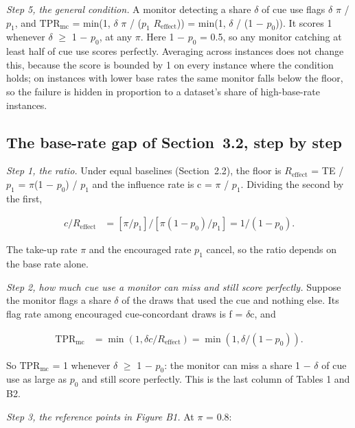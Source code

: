 \documentclass[11pt,a4paper]{article}
\begin{document}
\emph{Step 5, the general condition.} A monitor detecting a share $\delta$ of cue use flags $\delta$ $\pi$ / $p_1$, and $\mathrm{TPR}_{\mathrm{mc}}$ = min(1, $\delta$ $\pi$ / ($p_1$ $R_{\mathrm{effect}}$)) = min(1, $\delta$ / (1 $-$ $p_0$)). It scores 1 whenever $\delta$ $\geq$ 1 $-$ $p_0$, at any $\pi$. Here 1 $-$ $p_0$ = 0.5, so any monitor catching at least half of cue use scores perfectly. Averaging across instances does not change this, because the score is bounded by 1 on every instance where the condition holds; on instances with lower base rates the same monitor falls below the floor, so the failure is hidden in proportion to a dataset’s share of high-base-rate instances.

\setcounter{subsection}{2}
\subsection{The base-rate gap of Section~3.2, step by step}
\emph{Step 1, the ratio.} Under equal baselines (Section~2.2), the floor is $R_{\mathrm{effect}}$ = TE / $p_1$ = $\pi$(1 $-$ $p_0$) / $p_1$ and the influence rate is c = $\pi$ / $p_1$. Dividing the second by the first,

\begin{align*}
  c / R_{\mathrm{effect}} &= [\pi  / p_1] / [\pi (1 - p_0) / p_1] = 1 / (1 - p_0).
\end{align*}

The take-up rate $\pi$ and the encouraged rate $p_1$ cancel, so the ratio depends on the base rate alone.

\emph{Step 2, how much cue use a monitor can miss and still score perfectly.} Suppose the monitor flags a share $\delta$ of the draws that used the cue and nothing else. Its flag rate among encouraged cue-concordant draws is f = $\delta$c, and

\begin{align*}
  \mathrm{TPR}_{\mathrm{mc}} &= \min(1, \delta c / R_{\mathrm{effect}}) = \min(1, \delta  / (1 - p_0)).
\end{align*}

So $\mathrm{TPR}_{\mathrm{mc}}$ = 1 whenever $\delta$ $\geq$ 1 $-$ $p_0$: the monitor can miss a share 1 $-$ $\delta$ of cue use as large as $p_0$ and still score perfectly. This is the last column of Tables 1 and B2.

\emph{Step 3, the reference points in Figure B1.} At $\pi$ = 0.8:
\end{document}
